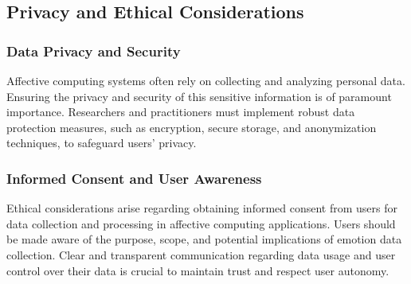 \subsection{Privacy and Ethical Considerations}
\subsubsection{Data Privacy and Security}
Affective computing systems often rely on collecting and analyzing personal data. 
Ensuring the privacy and security of this sensitive information is of paramount importance. 
Researchers and practitioners must implement robust data protection measures, such as encryption, secure storage, and anonymization techniques, to safeguard users' privacy.
\subsubsection{Informed Consent and User Awareness}
Ethical considerations arise regarding obtaining informed consent from users for data collection and processing in affective computing applications. 
Users should be made aware of the purpose, scope, and potential implications of emotion data collection.
Clear and transparent communication regarding data usage and user control over their data is crucial to maintain trust and respect user autonomy.
